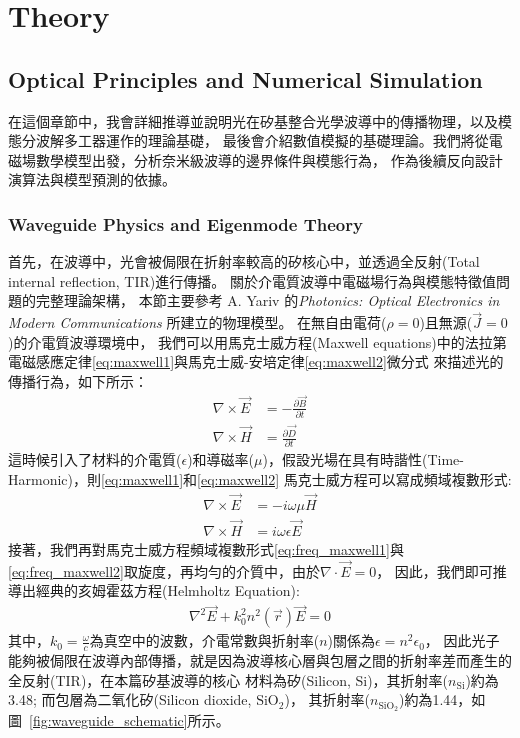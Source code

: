 \chapter{Theory}
\label{ch:architecture}

\section{Optical Principles and Numerical Simulation}
在這個章節中，我會詳細推導並說明光在矽基整合光學波導中的傳播物理，以及模態分波解多工器運作的理論基礎，
最後會介紹數值模擬的基礎理論。我們將從電磁場數學模型出發，分析奈米級波導的邊界條件與模態行為，
作為後續反向設計演算法與模型預測的依據。
\subsection{Waveguide Physics and Eigenmode Theory}
首先，在波導中，光會被侷限在折射率較高的矽核心中，並透過全反射(Total internal reflection, TIR)進行傳播。
關於介電質波導中電磁場行為與模態特徵值問題的完整理論架構，
本節主要參考 A. Yariv 的\textit{Photonics: Optical Electronics in Modern Communications} \cite{yariv2007_photonics} 所建立的物理模型。
在無自由電荷($\rho = 0$)且無源($\vec{J} = 0$)的介電質波導環境中，
我們可以用馬克士威方程(Maxwell equations)中的法拉第電磁感應定律\eqref{eq:maxwell1}與馬克士威-安培定律\eqref{eq:maxwell2}微分式
來描述光的傳播行為，如下所示：
\begin{align}
\nabla \times \vec{E} &= -\frac{\partial \vec{B}}{\partial t}
\label{eq:maxwell1} \\
\nabla \times \vec{H} &= \frac{\partial \vec{D}}{\partial t}
\label{eq:maxwell2}
\end{align}
這時候引入了材料的介電質($\epsilon$)和導磁率($\mu$)，假設光場在具有時諧性(Time-Harmonic)，則\eqref{eq:maxwell1}和\eqref{eq:maxwell2}
馬克士威方程可以寫成頻域複數形式:
\begin{align}
\nabla \times \vec{E} &= -i\omega\mu\vec{H}
\label{eq:freq_maxwell1} \\
\nabla \times \vec{H} &= i\omega\epsilon\vec{E}
\label{eq:freq_maxwell2}
\end{align}
接著，我們再對馬克士威方程頻域複數形式\eqref{eq:freq_maxwell1}與\eqref{eq:freq_maxwell2}取旋度，再均勻的介質中，由於$\nabla\cdot\vec{E} = 0$，
因此，我們即可推導出經典的亥姆霍茲方程(Helmholtz Equation):
\begin{align}
\nabla^2\vec{E} + k_0^2 n^2(\vec{r})\vec{E} = 0
\label{eq:helmholtz}
\end{align}
其中，$k_0 = \frac{\omega}{c}$為真空中的波數，介電常數與折射率($n$)關係為$\epsilon = n^2\epsilon_0$，
因此光子能夠被侷限在波導內部傳播，就是因為波導核心層與包層之間的折射率差而產生的全反射(TIR)，在本篇矽基波導的核心
材料為矽(Silicon, Si)，其折射率($n_{\mathrm{Si}}$)約為3.48; 而包層為二氧化矽(Silicon dioxide, $\mathrm{SiO_2}$)，
其折射率($n_{\text{SiO}_2}$)約為1.44，如圖~\ref{fig:waveguide_schematic}所示。

